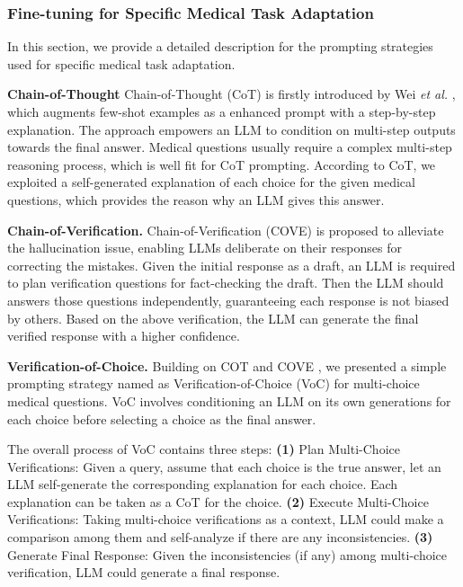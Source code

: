 \documentclass{article} %
\begin{document}
\subsubsection{Fine-tuning for Specific Medical Task Adaptation}
In this section, we provide a detailed description for the prompting strategies used for specific medical task adaptation. 

\textbf{Chain-of-Thought} Chain-of-Thought (CoT) is firstly introduced by Wei \textit{et al.} \cite{wei2022chain}, which augments few-shot examples as a enhanced prompt with a step-by-step explanation. The approach empowers an LLM to condition on multi-step outputs towards the final answer. Medical questions usually require a complex multi-step reasoning process, which is well fit for CoT prompting. According to CoT, we exploited a self-generated explanation of each choice for the given medical questions, which provides the reason why an LLM gives this answer.

\textbf{Chain-of-Verification.} Chain-of-Verification (COVE) \cite{dhuliawala2023chain} is proposed to alleviate the hallucination issue, enabling LLMs deliberate on their responses for correcting the mistakes. Given the initial response as a draft, an LLM is required to plan verification questions for fact-checking the draft. Then the LLM should answers those questions independently, guaranteeing each response is not biased by others. Based on the above verification, the LLM can generate the final verified response with a higher confidence.

\textbf{Verification-of-Choice.} Building on COT \cite{wei2022chain} and COVE \cite{dhuliawala2023chain}, we presented a simple prompting strategy named as Verification-of-Choice (VoC) for multi-choice medical questions. VoC involves conditioning an LLM on its own generations for each choice before selecting a choice as the final answer.

The overall process of VoC contains three steps: \textbf{(1)} Plan Multi-Choice Verifications: Given a query, assume that each choice is the true answer, let an LLM self-generate the corresponding explanation for each choice. Each explanation can be taken as a CoT for the choice. \textbf{(2)} Execute Multi-Choice Verifications: Taking multi-choice verifications as a context, LLM could make a comparison among them and self-analyze if there are any inconsistencies. \textbf{(3)} Generate Final Response: Given the inconsistencies (if any) among multi-choice verification, LLM could generate a final response.
\end{document}
